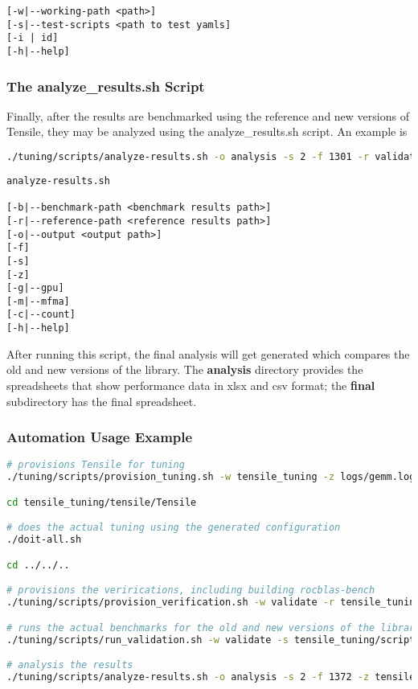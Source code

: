 \documentclass[]{article}
\begin{document}
\begin{verbatim}	
[-w|--working-path <path>] 
[-s|--test-scripts <path to test yamls] 
[-i | id]
[-h|--help]
\end{verbatim}

\subsubsection{The analyze\_results.sh Script}

Finally, after the results are benchmarked using the reference and new versions of Tensile, they may be analyzed using the analyze\_results.sh script. An example is

\begin{lstlisting}[language=bash,breaklines=true]
./tuning/scripts/analyze-results.sh -o analysis -s 2 -f 1301 -r validate/rocblas/rocBLAS-reference/build/release/clients/staging/results -b validate/rocblas/rocBLAS-verify/build/release/clients/staging/results 
\end{lstlisting}

\begin{verbatim}
analyze-results.sh 

[-b|--benchmark-path <benchmark results path>]
[-r|--reference-path <reference results path>] 
[-o|--output <output path>] 
[-f] 
[-s] 
[-z] 
[-g|--gpu] 
[-m|--mfma] 
[-c|--count] 
[-h|--help]
\end{verbatim}

After running this script, the final analysis will get generated which compares the old and new versions of the library. The \textbf{analysis} directory provides the spreadsheets that show performance data in xlsx and csv format; the \textbf{final} subdirectory has the final spreadsheet.

\subsubsection{Automation Usage Example}

\begin{lstlisting}[language=bash,breaklines=true]
# provisions Tensile for tuning
./tuning/scripts/provision_tuning.sh -w tensile_tuning -z logs/gemm.log -o tf_inception.yaml -y sgemm -l vega20 

cd tensile_tuning/tensile/Tensile

# does the actual tuning using the generated configuration
./doit-all.sh

cd ../../..

# provisions the verirications, including building rocblas-bench
./tuning/scripts/provision_verification.sh -w validate -r tensile_tuning/tensile/Tensile -l vega20

# runs the actual benchmarks for the old and new versions of the library
./tuning/scripts/run_validation.sh -w validate -s tensile_tuning/scripts

# analysis the results
./tuning/scripts/analyze-results.sh -o analysis -s 2 -f 1372 -z tensile_tuning/scripts/*-all.sh -r validate/rocblas/rocBLAS-reference/build/release/clients/staging/results1 -b validate/rocblas/rocBLAS-reference/build/release/clients/staging/results2
\end{lstlisting}
\end{document}

